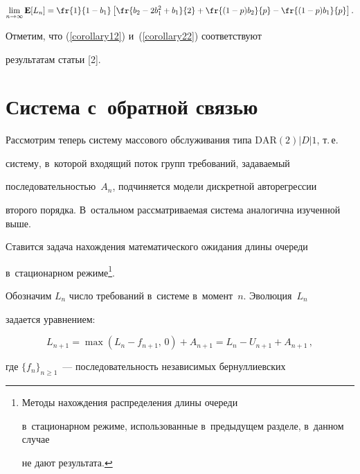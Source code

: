 \begin{equation}

\lim_{n\to\infty}\mathbf{E}[L_n]=\fr{1}{1-b_1}\left[

\fr{b_2-2b_1^2+b_1}{2}+\fr{(1-p)b_2}{p}-\fr{(1-p)b_1}{p}\right].

\label{corollary22}

\end{equation}



Отметим, что (\ref{corollary12}) и~(\ref{corollary22}) соответствуют

результатам статьи [2].



\section{Система {} с~обратной связью}



Рассмотрим теперь систему массового обслуживания типа $\mathrm{DAR}\left(2\right)|D|1$, т.\,е.\

систему, в~которой входящий поток групп требований, задаваемый

последовательностью~$A_n$, подчиняется модели дискретной авторегрессии

второго порядка. В~остальном рассматриваемая система аналогична изученной выше.



Ставится задача нахождения математического ожидания длины очереди

в~стационарном режиме\footnote{Методы нахождения распределения длины очереди

в~стационарном режиме, использованные в~предыдущем разделе, в~данном случае

не дают результата.}.



Обозначим $L_n$ число требований в~системе в~момент~$n$. Эволюция~$L_n$

задается уравнением:

\begin{equation}

L_{n+1}=\max\left(L_n-f_{n+1},\,0\right)+A_{n+1}=L_n-U_{n+1}+A_{n+1}\,,

\label{queuelength}

\end{equation}

где $\{f_n\}_{n\geq1}$~--- последовательность независимых бернуллиевских

